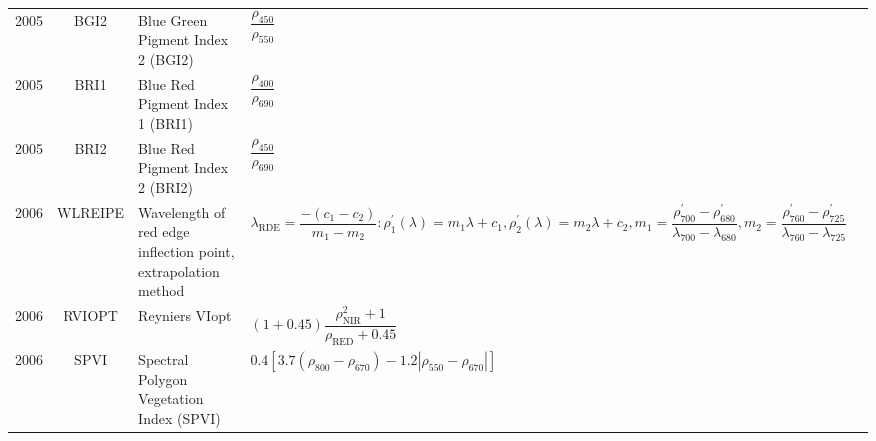 \documentclass[10pt]{article}
\begin{document}
\begin{ThreePartTable}
\begin{longtable}{c c m{2.80in} M{2.80in} M{1.5in}}
  2005 & BGI2    & Blue Green Pigment Index 2 (BGI2)                                              & $\dfrac{\rho_{450}}{\rho_{550}}$                                                                                                                                                                                                                                                        & \citet{Zarco-Tejada2005}                            \\
  2005 & BRI1    & Blue Red Pigment Index 1 (BRI1)                                                & $\dfrac{\rho_{400}}{\rho_{690}}$                                                                                                                                                                                                                                                        & \citet{Zarco-Tejada2005}                            \\
  2005 & BRI2    & Blue Red Pigment Index 2 (BRI2)                                                & $\dfrac{\rho_{450}}{\rho_{690}}$                                                                                                                                                                                                                                                        & \citet{Zarco-Tejada2005}                            \\
  2006 & WLREIPE & Wavelength of red edge inflection point, extrapolation method                  & $\lambda_\text{RDE} = \dfrac{-(c_1-c_2)}{m_1-m_2}:\rho^\prime_1(\lambda)=m_1\lambda+c_1,\rho^\prime_2(\lambda)=m_2\lambda+c_2,m_1=\dfrac{\rho^\prime_{700}-\rho^\prime_{680}}{\lambda_{700}-\lambda_{680}},m_2=\dfrac{\rho^\prime_{760}-\rho^\prime_{725}}{\lambda_{760}-\lambda_{725}}$& \citet{Cho2006}                                     \\
  2006 & RVIOPT  & Reyniers VIopt                                                                 & $(1+0.45)\dfrac{\rho^2_\text{NIR}+1}{\rho_\text{RED}+0.45}$                                                                                                                                                                                                                             & \citet{Reyniers2006}                                \\
  2006 & SPVI    & Spectral Polygon Vegetation Index (SPVI)                                       & $0.4[3.7(\rho_{800}-\rho_{670})-1.2|\rho_{550}-\rho_{670}|]$                                                                                                                                                                                                                            & \citet{Vincini2006}                                 \\

\end{longtable}
\end{ThreePartTable}
\end{document}
